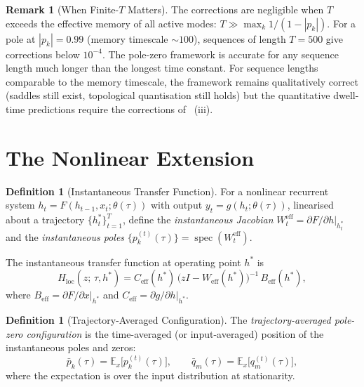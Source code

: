 \documentclass[11pt,a4paper]{article}
\theoremstyle{definition}
\newtheorem{definition}[theorem]{Definition}
\newtheorem{remark}[theorem]{Remark}
\DeclareMathOperator{\spec}{spec}
\newcommand{\E}{\mathbb{E}}
\begin{document}
\begin{remark}[When Finite-$T$ Matters]\label{rem:finite}
The corrections are negligible when $T$ exceeds the effective
memory of all active modes: $T \gg \max_k 1/(1-|p_k|)$. For a
pole at $|p_k| = 0.99$ (memory timescale $\sim 100$), sequences
of length $T = 500$ give corrections below $10^{-4}$. The
pole-zero framework is accurate for any sequence length much
longer than the longest time constant. For sequence lengths
comparable to the memory timescale, the framework remains
qualitatively correct (saddles still exist, topological
quantisation still holds) but the quantitative dwell-time
predictions require the corrections of
~(iii).
\end{remark}

\section{The Nonlinear Extension}\label{sec:nonlinear}

\begin{definition}[Instantaneous Transfer Function]%
\label{def:inst_transfer}
For a nonlinear recurrent system
$h_t = F(h_{t-1}, x_t; \theta(\tau))$ with output
$y_t = g(h_t; \theta(\tau))$, linearised about a trajectory
$\{h_t^*\}_{t=1}^T$, define the \emph{instantaneous Jacobian}
$W_t^{\mathrm{eff}} = \partial F / \partial h\big|_{h_t^*}$ and
the \emph{instantaneous poles}
$\{p_k^{(t)}(\tau)\} = \spec(W_t^{\mathrm{eff}})$.

The instantaneous transfer function at operating point $h^*$ is
\begin{equation}
  H_{\mathrm{loc}}(z;\, \tau, h^*)
  = C_{\mathrm{eff}}(h^*)\,
  \bigl(zI - W_{\mathrm{eff}}(h^*)\bigr)^{-1}\,
  B_{\mathrm{eff}}(h^*),
\end{equation}
where
$B_{\mathrm{eff}} = \partial F/\partial x\big|_{h^*}$ and
$C_{\mathrm{eff}} = \partial g/\partial h\big|_{h^*}$.
\end{definition}

\begin{definition}[Trajectory-Averaged Configuration]%
\label{def:traj_avg}
The \emph{trajectory-averaged pole-zero configuration} is the
time-averaged (or input-averaged) position of the instantaneous
poles and zeros:
\begin{equation}
  \bar{p}_k(\tau)
  = \E_{x}\bigl[p_k^{(t)}(\tau)\bigr], \qquad
  \bar{q}_m(\tau)
  = \E_{x}\bigl[q_m^{(t)}(\tau)\bigr],
\end{equation}
where the expectation is over the input distribution at
stationarity.
\end{definition}
\end{document}
